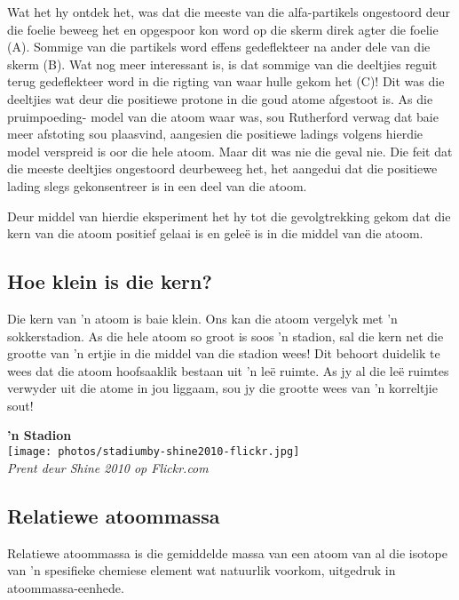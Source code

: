 Wat het hy ontdek het, was dat die meeste van die alfa-partikels ongestoord deur die foelie beweeg het en opgespoor kon word op die skerm direk agter die foelie (A). Sommige van die partikels word effens gedeflekteer na ander dele van die skerm (B). Wat nog meer interessant is, is dat sommige van die deeltjies reguit terug gedeflekteer word in die rigting van waar hulle gekom het (C)! Dit was die deeltjies wat deur die positiewe protone in die goud atome afgestoot is. As die pruimpoeding- model van die atoom waar was, sou Rutherford verwag dat baie meer afstoting sou plaasvind, aangesien die positiewe ladings volgens hierdie model verspreid is oor die hele atoom. Maar dit was nie die geval nie. Die feit dat die meeste deeltjies ongestoord deurbeweeg het, het aangedui dat die positiewe lading slegs gekonsentreer is in een deel van die atoom.\par 

Deur middel van hierdie eksperiment het hy tot die gevolgtrekking gekom dat die kern van die atoom positief gelaai is en gele\"{e} is in die middel van die atoom.
\subsection*{Hoe klein is die kern?}
\begin{minipage}{.5\textwidth}
Die kern van 'n atoom is baie klein. Ons kan die atoom vergelyk met 'n sokkerstadion. As die hele atoom so groot is soos 'n stadion, sal die kern net die grootte van 'n ertjie in die middel van die stadion wees! Dit behoort duidelik te wees dat die atoom hoofsaaklik bestaan uit  'n leë ruimte. As jy al die leë ruimtes verwyder uit die atome in jou liggaam, sou jy die grootte wees van 'n korreltjie sout!
\end{minipage}
\begin{minipage}{.5\textwidth}
\begin{center}
\textbf{'n Stadion}\\
 \texttt{[image: photos/stadiumby-shine2010-flickr.jpg]}\\
\textit{Prent deur Shine 2010 op Flickr.com}
\end{center}
\end{minipage}
      
            \subsection*{Relatiewe atoommassa}
            \nopagebreak
{} {Relatiewe atoommassa is die gemiddelde massa van een atoom van al die isotope van  'n spesifieke chemiese element wat natuurlik voorkom, uitgedruk in atoommassa-eenhede.} 

